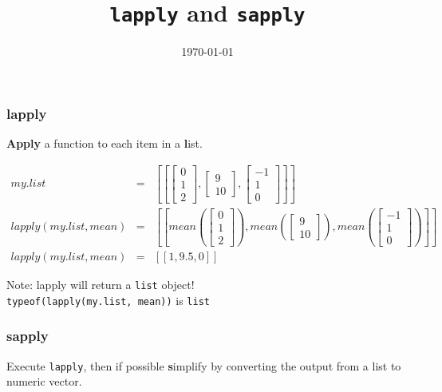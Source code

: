 \documentclass[12pt]{article}
\title{\texttt{lapply} and \texttt{sapply}}
\date{\today}
\begin{document}
 
\maketitle

\subsubsection*{lapply} 
\textbf{Apply} a function to each item in a \textbf{l}ist. 


\begin{eqnarray}
	my.list &=&  [[ \begin{bmatrix}
           0 \\
           1 \\
           2
         \end{bmatrix} , 
		 \begin{bmatrix}
		 	9 \\
			10
		 \end{bmatrix} ,
		 \begin{bmatrix}
		 	-1\\
			1 \\
			0
		 \end{bmatrix}		 
		 ]]\nonumber \\
	lapply(my.list, mean) &=& [[ mean(\begin{bmatrix}
           0 \\
           1 \\
           2
         \end{bmatrix} ), 
		 mean(\begin{bmatrix}
		 	9 \\
			10
		 \end{bmatrix} ),
		 mean(\begin{bmatrix}
		 	-1\\
			1 \\
			0
		 \end{bmatrix})
		 ]] \nonumber \\
	lapply(my.list, mean) &=& [[ 1,  9.5, 0]] \nonumber	
\end{eqnarray}

Note: lapply will return a \texttt{list} object! \\
\hspace*{2cm}\texttt{typeof(lapply(my.list, mean))} is \texttt{list}

\subsubsection*{sapply} 
Execute \texttt{lapply}, then if possible \textbf{s}implify by converting the output from a list to numeric vector. 
\end{document}
